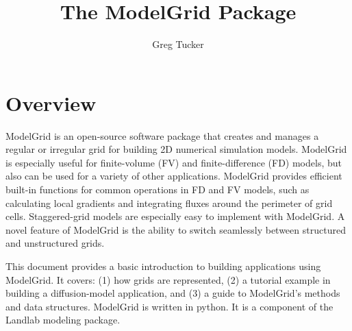 \documentclass[12pt]{article}
\title{The ModelGrid Package}
\author{Greg Tucker}
\begin{document}

\maketitle

\section{Overview}

ModelGrid is an open-source software package that creates and manages a regular or irregular grid for building 2D numerical simulation models. ModelGrid is especially useful for finite-volume (FV) and finite-difference (FD) models, but also can be used for a variety of other applications. ModelGrid provides efficient built-in functions for common operations in FD and FV models, such as calculating local gradients and integrating fluxes around the perimeter of grid cells. Staggered-grid models are especially easy to implement with ModelGrid.
A novel feature of ModelGrid is the ability to switch seamlessly between structured and unstructured grids.

This document provides a basic introduction to building applications using ModelGrid. It covers: (1) how grids are represented, (2) a tutorial example in building a diffusion-model application, and (3) a guide to ModelGrid's methods and data structures. ModelGrid is written in python. It is a component of the Landlab modeling package.
\end{document}
